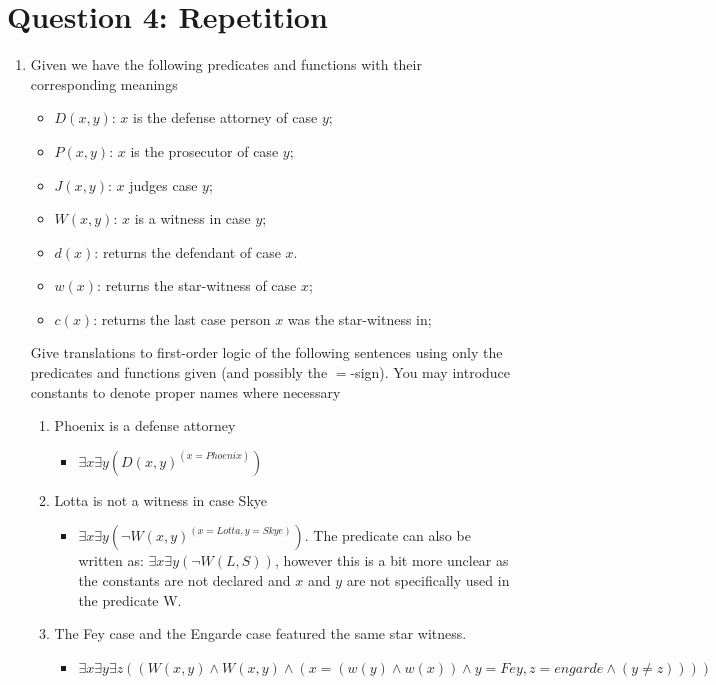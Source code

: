 \documentclass[a4paper]{article}
\begin{document}
\section{Question 4: Repetition}
\begin{enumerate}
    \item Given we have the following predicates and functions with their corresponding meanings
    \begin{itemize}
        \item $D(x,y)$: $x$ is the defense attorney of case $y$;
        \item $P(x,y)$: $x$ is the prosecutor of case $y$;
        \item $J(x,y)$: $x$ judges case $y$;
        \item $W(x,y)$: $x$ is a witness in case $y$;
        \item $d(x)$: returns the defendant of case $x$.
        \item $w(x)$: returns the star-witness of case $x$;
        \item $c(x)$: returns the last case person $x$ was the star-witness in;
    \end{itemize}
    Give translations to first-order logic of the following sentences using only the predicates and functions given (and possibly the $=$-sign). You may introduce constants to denote proper names where necessary
    \begin{enumerate}
        \item Phoenix is a defense attorney
        \begin{itemize}
            \item $\exists x \exists y (D(x,y) ^ (x = Phoenix))$
        \end{itemize}
        \item Lotta is not a witness in case Skye
        \begin{itemize}
            \item $\exists x \exists y (\neg W(x,y) ^ (x = Lotta, y = Skye))$. The predicate can also be written as: $\exists x \exists y (\neg W(L, S))$, however this is a bit more unclear as the constants are not declared and $x$ and $y$ are not specifically used in the predicate W.
        \end{itemize}
        \item The Fey case and the Engarde case featured the same star witness.
        \begin{itemize}
            \item $\exists x \exists y \exists z ((W(x, y) \land W(x, y) \land (x = (w(y) \land w(x)) \land y = Fey, z = engarde \land (y \neq z))))$

\end{itemize}
\end{enumerate}
\end{enumerate}
\end{document}
